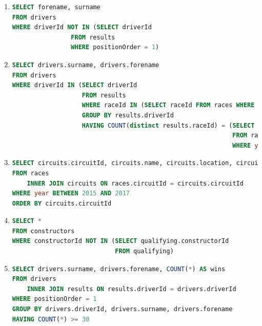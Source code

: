 \documentclass{db-practice}
\begin{document}
\begin{enumerate}
\item
\begin{lstlisting}[language=SQL]
SELECT forename, surname
FROM drivers
WHERE driverId NOT IN (SELECT driverId
                FROM results
                WHERE positionOrder = 1)
\end{lstlisting}
         
\item
\begin{lstlisting}[language=SQL]
SELECT drivers.surname, drivers.forename
FROM drivers
WHERE driverId IN (SELECT driverId
                   FROM results
                   WHERE raceId IN (SELECT raceId FROM races WHERE year=2017)
                   GROUP BY results.driverId
                   HAVING COUNT(distinct results.raceId) = (SELECT COUNT(*)
                                                            FROM races
                                                            WHERE year=2017))
\end{lstlisting}

\item
\begin{lstlisting}[language=SQL]
SELECT circuits.circuitId, circuits.name, circuits.location, circuits.country, year
FROM races 
    INNER JOIN circuits ON races.circuitId = circuits.circuitId
WHERE year BETWEEN 2015 AND 2017
ORDER BY circuits.circuitId
\end{lstlisting}

\item
\begin{lstlisting}[language=SQL]
SELECT *
FROM constructors
WHERE constructorId NOT IN (SELECT qualifying.constructorId 
                            FROM qualifying)  
\end{lstlisting}
        
\item
\begin{lstlisting}[language=SQL]
SELECT drivers.surname, drivers.forename, COUNT(*) AS wins
FROM drivers
    INNER JOIN results ON results.driverId = drivers.driverId
WHERE positionOrder = 1
GROUP BY drivers.driverId, drivers.surname, drivers.forename
HAVING COUNT(*) >= 30
\end{lstlisting}


\end{enumerate}
\end{document}
